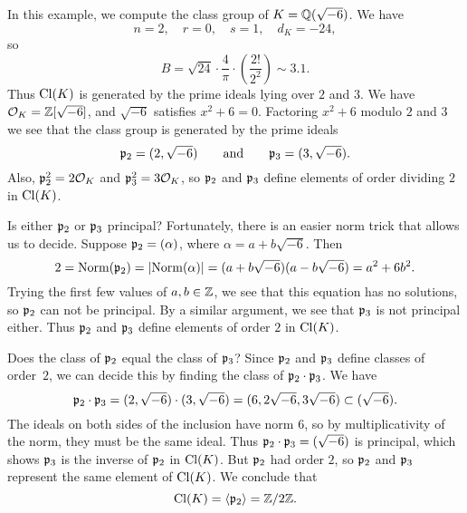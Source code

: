 \begin{example}
In this example, we compute the class group of $K=\mathbb{Q}(\sqrt{-6})$.
We have
$$
  n = 2, \quad r=0, \quad s=1, \quad d_K = -24,
$$
so
$$
  B = \sqrt{24} \cdot \frac{4}{\pi} \cdot
       \left(\frac{2!}{2^2}\right)\sim 3.1.
$$
Thus $\operatorname{Cl}(K)$ is generated by the prime ideals lying over $2$ and $3$.
We have $\mathcal{O}_K=\mathbb{Z}[\sqrt{-6}]$, and $\sqrt{-6}$ satisfies $x^2+6=0$.
Factoring $x^2+6$ modulo $2$ and $3$ we see that the class group
is generated by the prime ideals
$$
  \mathfrak{p}_2 = (2,\sqrt{-6})\qquad\text{and}\qquad
  \mathfrak{p}_3 = (3,\sqrt{-6}).
$$
Also, $\mathfrak{p}_2^2 = 2\mathcal{O}_K$ and $\mathfrak{p}_3^2=3\mathcal{O}_K$, so
$\mathfrak{p}_2$ and $\mathfrak{p}_3$ define elements of order
dividing $2$ in $\operatorname{Cl}(K)$.

Is either $\mathfrak{p}_2$ or $\mathfrak{p}_3$ principal?  Fortunately,
there is an easier norm trick that allows us to decide.
Suppose $\mathfrak{p}_2 = (\alpha)$, where $\alpha=a+b\sqrt{-6}$.
Then $$2=\operatorname{Norm}(\mathfrak{p}_2) = \left|\operatorname{Norm}(\alpha)\right| = (a+b\sqrt{-6})(a-b\sqrt{-6})
   = a^2 + 6b^2.$$
Trying the first few values of $a, b\in \mathbb{Z}$, we see that this
equation has no solutions, so $\mathfrak{p}_2$ can not
be principal.  By a similar argument, we see that $\mathfrak{p}_3$
is not principal either.  Thus $\mathfrak{p}_2$ and $\mathfrak{p}_3$ define
elements of order $2$ in $\operatorname{Cl}(K)$.

Does the class of $\mathfrak{p}_2$ equal the class of $\mathfrak{p}_3$?
Since $\mathfrak{p}_2$ and $\mathfrak{p}_3$ define classes of order~$2$,
we can decide this by finding the class of $\mathfrak{p}_2\cdot \mathfrak{p}_3$.
We have
$$
 \mathfrak{p}_2\cdot \mathfrak{p}_3 =  (2,\sqrt{-6})\cdot (3,\sqrt{-6})
   = (6,2\sqrt{-6}, 3\sqrt{-6}) \subset (\sqrt{-6}).$$
The ideals on both sides of the inclusion have norm $6$,
so by multiplicativity of the norm, they must be the
same ideal.  Thus $\mathfrak{p}_2\cdot \mathfrak{p}_3=(\sqrt{-6})$ is principal,
which shows $\mathfrak{p}_3$ is the inverse of $\mathfrak{p}_2$ in $\operatorname{Cl}(K)$. But
$\mathfrak{p}_2$ had order $2$,
so $\mathfrak{p}_2$ and $\mathfrak{p}_3$ represent the same element of $\operatorname{Cl}(K)$.
We conclude that $$\operatorname{Cl}(K) = \langle \mathfrak{p}_2 \rangle = \mathbb{Z}/2\mathbb{Z}.$$
\end{example}

